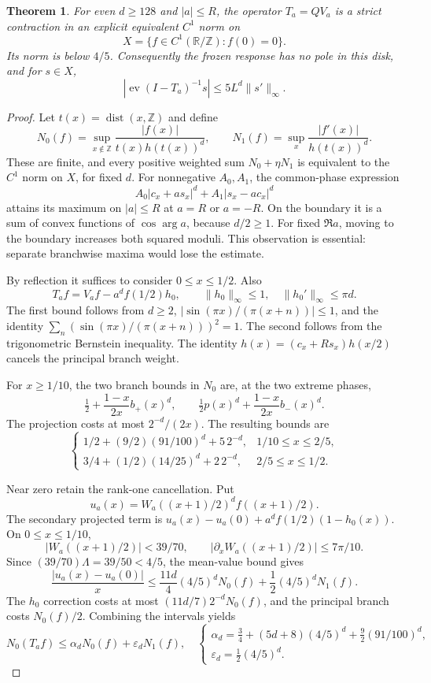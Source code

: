 \documentclass[11pt,a4paper]{article}
\newtheorem{theorem}{Theorem}[section]\newtheorem{lemma}[theorem]{Lemma}\newtheorem{proposition}[theorem]{Proposition}
\theoremstyle{remark}\newtheorem*{ednote}{Editorial note (ProveIt, 2026-10-01)}
\newcommand{\ev}{\operatorname{ev}}\newcommand{\Z}{\mathbb Z}\newcommand{\C}{\mathbb C}
\begin{document}
\begin{theorem}\label{thm:green}
For even $d\ge128$ and $|a|\le R$, the operator $T_a=QV_a$ is a strict contraction in an explicit equivalent $C^1$ norm on
\[
 X=\{f\in C^1(\mathbb R/\mathbb Z):f(0)=0\}.
\]
Its norm is below $4/5$. Consequently the frozen response has no pole in this disk, and for $s\in X$,
\begin{equation}\label{eq:green}
 |\ev(I-T_a)^{-1}s|\le5L^d\|s'\|_\infty.
\end{equation}
\end{theorem}
\begin{proof}
Let $t(x)=\operatorname{dist}(x,\Z)$ and define
\[
 N_0(f)=\sup_{x\notin\Z}\frac{|f(x)|}{t(x)h(t(x))^d},\qquad
 N_1(f)=\sup_x\frac{|f'(x)|}{h(t(x))^d}.
\]
These are finite, and every positive weighted sum $N_0+\eta N_1$ is equivalent to the $C^1$ norm on $X$, for fixed $d$. For nonnegative $A_0,A_1$, the common-phase expression
\[
 A_0|c_x+as_x|^d+A_1|s_x-ac_x|^d
\]
attains its maximum on $|a|\le R$ at $a=R$ or $a=-R$. On the boundary it is a sum of convex functions of $\cos\arg a$, because $d/2\ge1$. For fixed $\Re a$, moving to the boundary increases both squared moduli. This observation is essential: separate branchwise maxima would lose the estimate.

By reflection it suffices to consider $0\le x\le1/2$. Also
\[
 T_af=V_af-a^df(1/2)h_0,\qquad
 \|h_0\|_\infty\le1,\quad \|h_0'\|_\infty\le\pi d.
\]
The first bound follows from $d\ge2$, $|\sin(\pi x)/(\pi(x+n))|\le1$, and the identity $\sum_n(\sin(\pi x)/(\pi(x+n)))^2=1$. The second follows from the trigonometric Bernstein inequality. The identity $h(x)=(c_x+Rs_x)h(x/2)$ cancels the principal branch weight.

For $x\ge1/10$, the two branch bounds in $N_0$ are, at the two extreme phases,
\[
 \tfrac12+\frac{1-x}{2x}b_+(x)^d,\qquad
 \tfrac12p(x)^d+\frac{1-x}{2x}b_-(x)^d.
\]
The projection costs at most $2^{-d}/(2x)$. The resulting bounds are
\[
 \begin{cases}
 1/2+(9/2)(91/100)^d+5\,2^{-d},&1/10\le x\le2/5,\\
 3/4+(1/2)(14/25)^d+2\,2^{-d},&2/5\le x\le1/2.
 \end{cases}
\]

Near zero retain the rank-one cancellation. Put
\[
 u_a(x)=W_a((x+1)/2)^d f((x+1)/2).
\]
The secondary projected term is
$u_a(x)-u_a(0)+a^df(1/2)(1-h_0(x))$. On $0\le x\le1/10$,
\[
 |W_a((x+1)/2)|<39/70,\qquad
 |\partial_xW_a((x+1)/2)|\le7\pi/10.
\]
Since $(39/70)\Lambda=39/50<4/5$, the mean-value bound gives
\[
 \frac{|u_a(x)-u_a(0)|}{x}
 \le\frac{11d}{4}(4/5)^dN_0(f)+\frac12(4/5)^dN_1(f).
\]
The $h_0$ correction costs at most $(11d/7)2^{-d}N_0(f)$, and the principal branch costs $N_0(f)/2$. Combining the intervals yields
\begin{equation}\label{eq:norm0}
 N_0(T_af)\le\alpha_dN_0(f)+\varepsilon_dN_1(f),\quad
 \begin{cases}
 \alpha_d=\frac34+(5d+8)(4/5)^d+\frac92(91/100)^d,\\
 \varepsilon_d=\frac12(4/5)^d.
 \end{cases}
\end{equation}


\end{proof}
\end{document}
